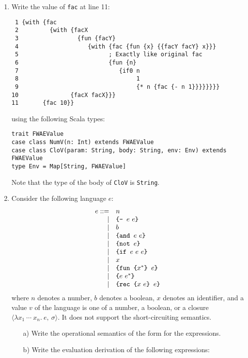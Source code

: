 \begin{enumerate}
\item Write the value of \texttt{fac} at line 11:

\begin{verbatim}
 1 {with {fac
 2         {with {facX
 3                 {fun {facY}
 4                    {with {fac {fun {x} {{facY facY} x}}}
 5                          ; Exactly like original fac
 6                          {fun {n}
 7                             {if0 n
 8                                  1
 9                                  {* n {fac {- n 1}}}}}}}}
10               {facX facX}}}
11       {fac 10}}
\end{verbatim}

using the following Scala types:
\begin{verbatim}
trait FWAEValue
case class NumV(n: Int) extends FWAEValue
case class CloV(param: String, body: String, env: Env) extends FWAEValue
type Env = Map[String, FWAEValue]
\end{verbatim}
Note that the type of the body  of \texttt{CloV} is \texttt{String}.

\item Consider the following language $e$:
\[
\begin{array}{rll}
e ::= & n\\
\mid& \verb!{- ! e\ e\verb+}+\\
\mid& b\\
\mid& \verb!{and ! e\ e\verb+}+\\
\mid& \verb!{not ! e\verb+}+\\
\mid& \verb!{if ! e\ e\ e\verb+}+\\
\mid& x\\
\mid& \verb!{fun {! x^*\verb+} +e\verb+}+\\
\mid& \verb!{! e\ e^*\verb+}+\\
\mid& \verb!{rec {! x\ e\verb+} +e\verb+}+\\
\end{array}
\]
where $n$ denotes a number, $b$ denotes a boolean, $x$ denotes an identifier,
and a value $v$ of the language is one of a number, a boolean, or a closure
$\langle \lambda x_1\ \cdots\ x_n .\ e,\ \sigma\rangle$.
It does not support the short-circuiting semantics.
\begin{itemize}
  \item[a)]
Write the operational semantics of the form  for the expressions.
  \item[b)] Write the evaluation derivation of the following expressions:


\end{itemize}
\end{enumerate}
